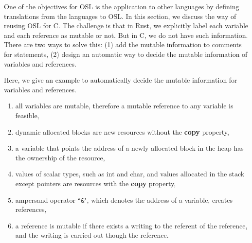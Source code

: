 \documentclass[runningheads]{llncs}
\def\codec#1{\texttt{#1}}
\newcommand{\terminal}[1]{\textbf{#1}}
\begin{document}
One of the objectives for OSL is the application to other languages by defining translations from the languages to OSL.
In this section, we discuss the way of reusing OSL for C.
The challenge is that in Rust, we explicitly label each variable and
each reference as mutable or not.
But in C, we do not have such information.
There are two ways to solve this: (1) add the mutable information to comments for
statements, 
%
(2) design an automatic way to decide the mutable information of variables and references.

%

Here, we give an example to automatically decide the mutable information for variables and references.

\begin{enumerate}
	\item all variables are mutable, therefore a mutable reference to any variable is feasible, 
	\item dynamic allocated blocks are new resources without the \terminal{copy} property,
	\item a variable that points the address of a newly allocated block in the heap has the ownership of the resource,
	\item values of scalar types, such as int and char, and values allocated in the stack except pointers are resources with the \terminal{copy} property,
	\item ampersand operator ``\codec{\&}", which denotes the address of a variable, creates references,
	\item a reference is mutable if there exists a writing to the referent of the reference, and the writing is carried out though the reference.
\end{enumerate}
\end{document}
